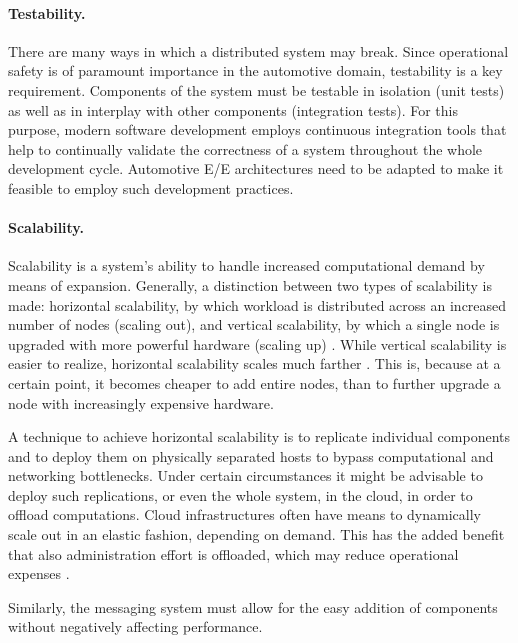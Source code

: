 \paragraph{Testability.}
There are many ways in which a distributed system may break. Since operational safety is of paramount importance in the automotive domain, testability is a key requirement. Components of the system must be testable in isolation (unit tests) as well as in interplay with other components (integration tests). For this purpose, modern software development employs continuous integration tools that help to continually validate the correctness of a system throughout the whole development cycle. Automotive E/E architectures need to be adapted to make it feasible to employ such development practices.


\paragraph{Scalability.}
Scalability  is a system's ability to handle increased computational demand by means of expansion. Generally, a distinction between two types of scalability is made: horizontal scalability, by which workload is distributed across an increased number of nodes (scaling out), and vertical scalability, by which a single node is upgraded with more powerful hardware (scaling up) \cite{tanenbaum2017distributed}. While vertical scalability is easier to realize, horizontal scalability scales much farther . This is, because at a certain point, it becomes cheaper to add entire nodes, than to further upgrade a node with increasingly expensive hardware.

A technique to achieve horizontal scalability is to replicate individual components and to deploy them on physically separated hosts to bypass computational and networking bottlenecks. Under certain circumstances it might be advisable to deploy such replications, or even the whole system, in the cloud, in order to offload computations. Cloud infrastructures often have means to dynamically scale out in an elastic fashion, depending on demand. This has the added benefit that also administration effort is offloaded, which may reduce operational expenses \cite{vaquero2011dynamically}.

Similarly, the messaging system must allow for the easy addition of components without negatively affecting performance.

%
%
%
%
%
%
%
%
%
%

